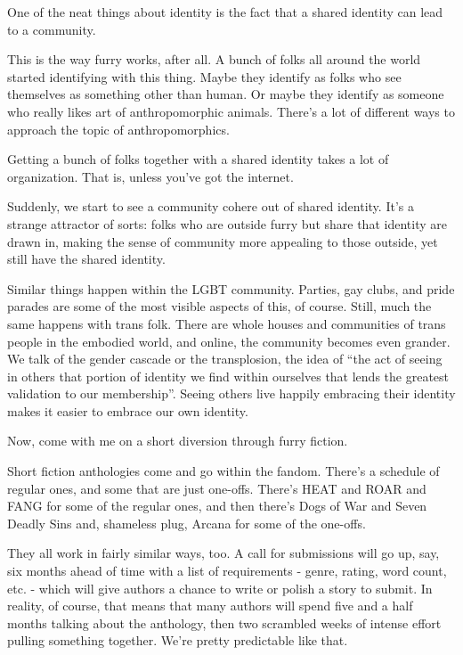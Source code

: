
One of the neat things about identity is the fact that a shared identity can lead to a community.

This is the way furry works, after all. A bunch of folks all around the world started identifying with this thing. Maybe they identify as folks who see themselves as something other than human. Or maybe they identify as someone who really likes art of anthropomorphic animals. There's a lot of different ways to approach the topic of anthropomorphics.

Getting a bunch of folks together with a shared identity takes a lot of organization. That is, unless you've got the internet.

Suddenly, we start to see a community cohere out of shared identity. It's a strange attractor of sorts: folks who are outside furry but share that identity are drawn in, making the sense of community more appealing to those outside, yet still have the shared identity.

Similar things happen within the LGBT community. Parties, gay clubs, and pride parades are some of the most visible aspects of this, of course. Still, much the same happens with trans folk. There are whole houses and communities of trans people in the embodied world, and online, the community becomes even grander. We talk of the gender cascade or the transplosion, the idea of ``the act of seeing in others that portion of identity we find within ourselves that lends the greatest validation to our membership''. Seeing others live happily embracing their identity makes it easier to embrace our own identity.

Now, come with me on a short diversion through furry fiction.

Short fiction anthologies come and go within the fandom. There's a schedule of regular ones, and some that are just one-offs. There's HEAT and ROAR and FANG for some of the regular ones, and then there's Dogs of War and Seven Deadly Sins and, shameless plug, Arcana for some of the one-offs.

They all work in fairly similar ways, too. A call for submissions will go up, say, six months ahead of time with a list of requirements - genre, rating, word count, etc. - which will give authors a chance to write or polish a story to submit. In reality, of course, that means that many authors will spend five and a half months talking about the anthology, then two scrambled weeks of intense effort pulling something together. We're pretty predictable like that.

